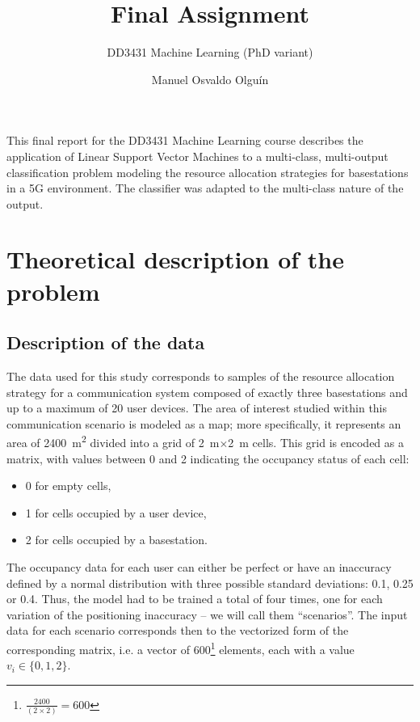\documentclass{kthreport}
\title{Final Assignment}
\subtitle{DD3431 Machine Learning (PhD variant)}
\author{Manuel Osvaldo Olguín}
\theoremstyle{definition}
\begin{document}
\maketitle

This final report for the DD3431 Machine Learning course describes the application of Linear Support Vector Machines to a multi-class, multi-output classification problem modeling the resource allocation strategies for basestations in a 5G environment. The classifier was adapted to the multi-class nature of the output.

\section{Theoretical description of the problem}

\subsection{Description of the data}\label{sec:data}

The data used for this study corresponds to samples of the resource allocation strategy for a communication system composed of exactly three basestations and up to a maximum of \num{20} user devices. The area of interest studied within this communication scenario is modeled as a map; more specifically, it represents an area of \SI{2400}{\metre\squared} divided into a grid of \SI{2}{\metre}$\times$\SI{2}{\metre} cells. This grid is encoded as a matrix, with values between \num{0} and \num{2} indicating the occupancy status of each cell:
\begin{itemize}
	\item \num{0} for empty cells,
	\item \num{1} for cells occupied by a user device,
	\item \num{2} for cells occupied by a basestation.
\end{itemize}

The occupancy data for each user can either be perfect or have an inaccuracy defined by a normal distribution with three possible standard deviations: \num{0.1}, \num{0.25} or \num{0.4}. Thus, the model had to be trained a total of four times, one for each variation of the positioning inaccuracy -- we will call them ``scenarios''. The input data for each scenario corresponds then to the vectorized form of the corresponding matrix, i.e. a vector of \num{600}\footnote{$\frac{2400}{(2\times2)} = 600$} elements, each with a value $v_i \in \{0, 1, 2\}$.
\end{document}
